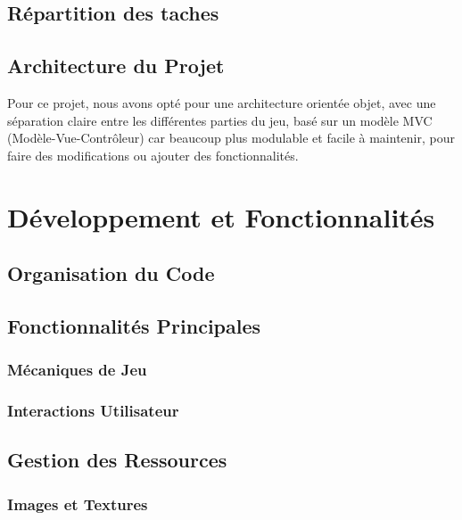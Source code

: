 \documentclass{article}
\begin{document}
    \subsection{Répartition des taches}\label{subsec:repartition-des-taches}


    \subsection{Architecture du Projet}\label{subsec:architecture-du-projet}
    Pour ce projet, nous avons opté pour une architecture orientée objet, avec une séparation claire entre les différentes parties du jeu, basé sur un modèle MVC (Modèle-Vue-Contrôleur) car beaucoup plus modulable et facile à maintenir, pour faire des modifications ou ajouter des fonctionnalités.


    \section{Développement et Fonctionnalités}\label{sec:developpement-et-fonctionnalites}

    \subsection{Organisation du Code}\label{subsec:organisation-du-code}

    \subsection{Fonctionnalités Principales}\label{subsec:fonctionnalites-principales}

    \subsubsection{Mécaniques de Jeu}

    \subsubsection*{Interactions Utilisateur}

    \subsection{Gestion des Ressources}\label{subsec:gestion-des-ressources}

    \subsubsection*{Images et Textures}
\end{document}
